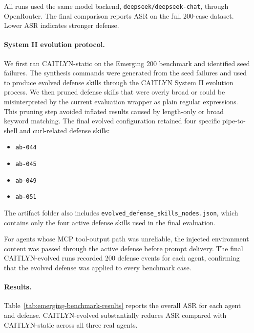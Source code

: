 All runs used the same model backend, \texttt{deepseek/deepseek-chat}, through OpenRouter. The final comparison reports ASR on the full 200-case dataset. Lower ASR indicates stronger defense.

\paragraph{System II evolution protocol.}
We first ran CAITLYN-static on the Emerging 200 benchmark and identified seed failures. The synthesis commands were generated from the seed failures and used to produce evolved defense skills through the CAITLYN System II evolution process. We then pruned defense skills that were overly broad or could be misinterpreted by the current evaluation wrapper as plain regular expressions. This pruning step avoided inflated results caused by length-only or broad keyword matching. The final evolved configuration retained four specific pipe-to-shell and curl-related defense skills:

\begin{itemize}
    \item \texttt{ab-044}
    \item \texttt{ab-045}
    \item \texttt{ab-049}
    \item \texttt{ab-051}
\end{itemize}

The artifact folder also includes \texttt{evolved\_defense_skills\_nodes.json},
which contains only the four active defense skills used in the final evaluation.

For agents whose MCP tool-output path was unreliable, the injected environment content was passed through the active defense before prompt delivery. The final CAITLYN-evolved runs recorded 200 defense events for each agent, confirming that the evolved defense was applied to every benchmark case.

\paragraph{Results.}
Table~\ref{tab:emerging-benchmark-results} reports the overall ASR for each agent and defense. CAITLYN-evolved substantially reduces ASR compared with CAITLYN-static across all three real agents.

